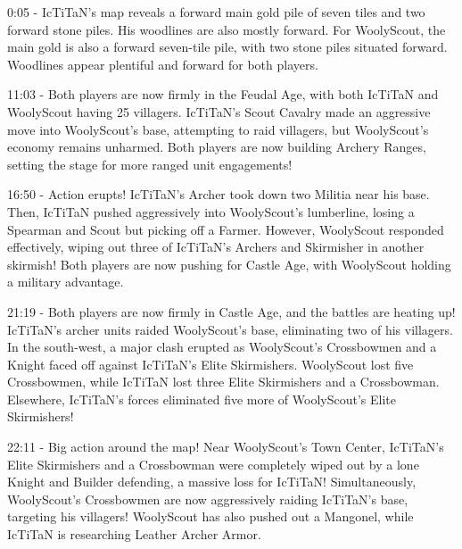 0:05 - IcTiTaN's map reveals a forward main gold pile of seven tiles and two forward stone piles. His woodlines are also mostly forward. For WoolyScout, the main gold is also a forward seven-tile pile, with two stone piles situated forward. Woodlines appear plentiful and forward for both players. \par \vspace{1em}

11:03 - Both players are now firmly in the Feudal Age, with both IcTiTaN and WoolyScout having 25 villagers. IcTiTaN's Scout Cavalry made an aggressive move into WoolyScout's base, attempting to raid villagers, but WoolyScout's economy remains unharmed. Both players are now building Archery Ranges, setting the stage for more ranged unit engagements! \par \vspace{1em}

16:50 - Action erupts! IcTiTaN's Archer took down two Militia near his base. Then, IcTiTaN pushed aggressively into WoolyScout's lumberline, losing a Spearman and Scout but picking off a Farmer. However, WoolyScout responded effectively, wiping out three of IcTiTaN's Archers and Skirmisher in another skirmish! Both players are now pushing for Castle Age, with WoolyScout holding a military advantage. \par \vspace{1em}

21:19 - Both players are now firmly in Castle Age, and the battles are heating up! IcTiTaN's archer units raided WoolyScout's base, eliminating two of his villagers. In the south-west, a major clash erupted as WoolyScout's Crossbowmen and a Knight faced off against IcTiTaN's Elite Skirmishers. WoolyScout lost five Crossbowmen, while IcTiTaN lost three Elite Skirmishers and a Crossbowman. Elsewhere, IcTiTaN's forces eliminated five more of WoolyScout's Elite Skirmishers! \par \vspace{1em}

22:11 - Big action around the map! Near WoolyScout's Town Center, IcTiTaN's Elite Skirmishers and a Crossbowman were completely wiped out by a lone Knight and Builder defending, a massive loss for IcTiTaN! Simultaneously, WoolyScout's Crossbowmen are now aggressively raiding IcTiTaN's base, targeting his villagers! WoolyScout has also pushed out a Mangonel, while IcTiTaN is researching Leather Archer Armor. \par \vspace{1em}

